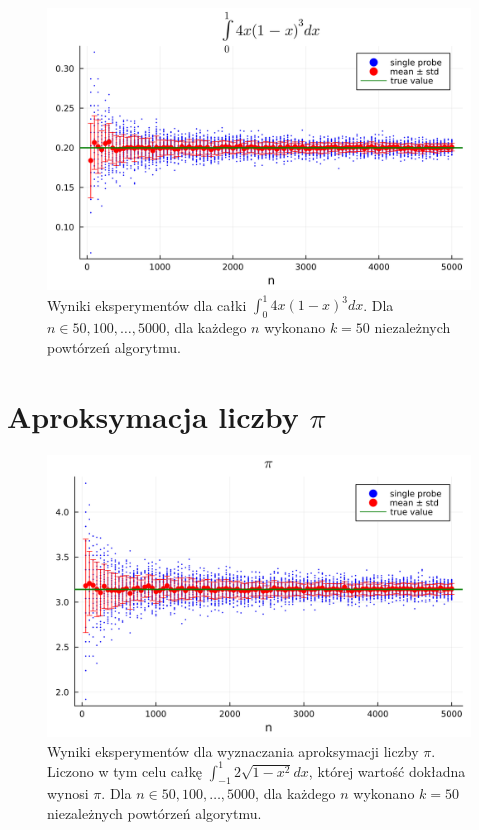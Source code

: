 \documentclass{article}
\begin{document}
\begin{figure}[!h]
    \centering
    \includegraphics[width=\linewidth]{results/z1_3.png}
    \caption{Wyniki eksperymentów dla całki $\int_0^1 4x(1-x)^3 dx$. Dla $n \in {50, 100, \dots, 5000}$, dla każdego $n$ wykonano $k=50$ niezależnych powtórzeń algorytmu.}
\end{figure}



\section{Aproksymacja liczby $\pi$}

\begin{figure}[!htbp]
    \centering
    \includegraphics[width=\linewidth]{results/z1_4.png}
    \caption{Wyniki eksperymentów dla wyznaczania aproksymacji liczby $\pi$. Liczono w tym celu całkę $\int_{-1}^{1} 2\sqrt{1-x^2} dx$, której wartość dokładna wynosi $\pi$. Dla $n \in {50, 100, \dots, 5000}$, dla każdego $n$ wykonano $k=50$ niezależnych powtórzeń algorytmu.}
\end{figure}
\end{document}

